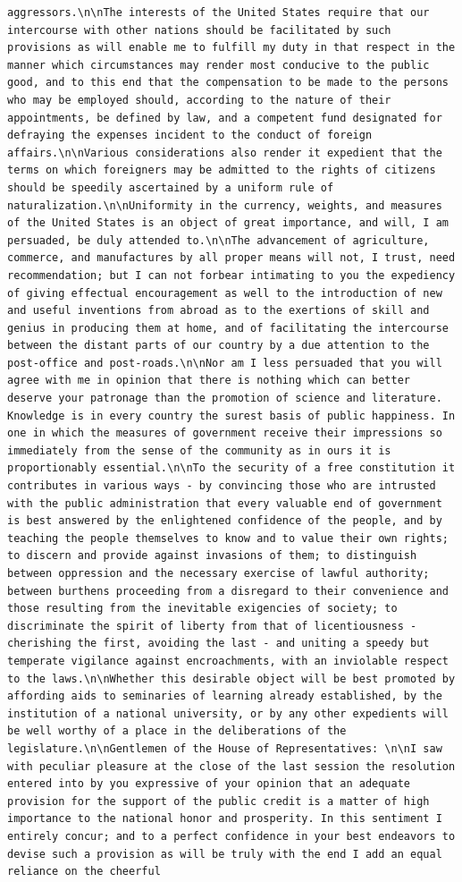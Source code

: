 \documentclass[
  letterpaper,
  DIV=11,
  numbers=noendperiod]{scrreprt}
\begin{document}
\begin{verbatim}
aggressors.\n\nThe interests of the United States require that our intercourse with other nations should be facilitated by such provisions as will enable me to fulfill my duty in that respect in the manner which circumstances may render most conducive to the public good, and to this end that the compensation to be made to the persons who may be employed should, according to the nature of their appointments, be defined by law, and a competent fund designated for defraying the expenses incident to the conduct of foreign affairs.\n\nVarious considerations also render it expedient that the terms on which foreigners may be admitted to the rights of citizens should be speedily ascertained by a uniform rule of naturalization.\n\nUniformity in the currency, weights, and measures of the United States is an object of great importance, and will, I am persuaded, be duly attended to.\n\nThe advancement of agriculture, commerce, and manufactures by all proper means will not, I trust, need recommendation; but I can not forbear intimating to you the expediency of giving effectual encouragement as well to the introduction of new and useful inventions from abroad as to the exertions of skill and genius in producing them at home, and of facilitating the intercourse between the distant parts of our country by a due attention to the post-office and post-roads.\n\nNor am I less persuaded that you will agree with me in opinion that there is nothing which can better deserve your patronage than the promotion of science and literature. Knowledge is in every country the surest basis of public happiness. In one in which the measures of government receive their impressions so immediately from the sense of the community as in ours it is proportionably essential.\n\nTo the security of a free constitution it contributes in various ways - by convincing those who are intrusted with the public administration that every valuable end of government is best answered by the enlightened confidence of the people, and by teaching the people themselves to know and to value their own rights; to discern and provide against invasions of them; to distinguish between oppression and the necessary exercise of lawful authority; between burthens proceeding from a disregard to their convenience and those resulting from the inevitable exigencies of society; to discriminate the spirit of liberty from that of licentiousness - cherishing the first, avoiding the last - and uniting a speedy but temperate vigilance against encroachments, with an inviolable respect to the laws.\n\nWhether this desirable object will be best promoted by affording aids to seminaries of learning already established, by the institution of a national university, or by any other expedients will be well worthy of a place in the deliberations of the legislature.\n\nGentlemen of the House of Representatives: \n\nI saw with peculiar pleasure at the close of the last session the resolution entered into by you expressive of your opinion that an adequate provision for the support of the public credit is a matter of high importance to the national honor and prosperity. In this sentiment I entirely concur; and to a perfect confidence in your best endeavors to devise such a provision as will be truly with the end I add an equal reliance on the cheerful 
\end{verbatim}
\end{document}
